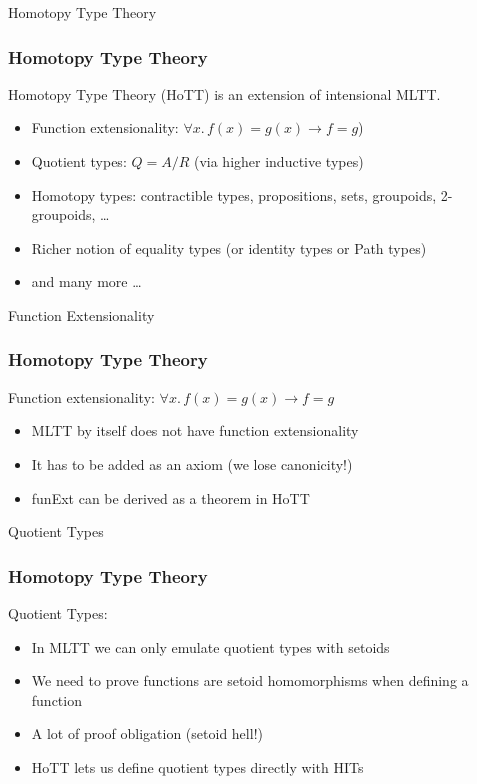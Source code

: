 \documentclass[9pt]{beamer}
\begin{document}
\begin{frame}{Homotopy Type Theory}
\frametitle{Homotopy Type Theory}

Homotopy Type Theory (HoTT) is an extension of intensional MLTT.

\begin{itemize}

  \item Function extensionality: $\forall x. \, f(x) = g(x) \rightarrow f = g$)

  \item Quotient types: $Q = A / R$ (via higher inductive types)

  \item Homotopy types: contractible types, propositions, sets, groupoids, 2-groupoids, \ldots

  \item Richer notion of equality types (or identity types or Path types)

  \item and many more \ldots

\end{itemize}

\end{frame}

\begin{frame}{Function Extensionality}
\frametitle{Homotopy Type Theory}

Function extensionality: $\forall x. \, f(x) = g(x) \rightarrow f = g$

\begin{itemize}

  \item MLTT by itself does not have function extensionality

  \item It has to be added as an axiom (we lose \alert{canonicity}!)

  \item<2-> funExt can be derived as a theorem in HoTT

\end{itemize}

\end{frame}

\begin{frame}{Quotient Types}
\frametitle{Homotopy Type Theory}

Quotient Types:

\begin{itemize}

  \item In MLTT we can only emulate quotient types with setoids
  \item We need to prove functions are setoid homomorphisms when defining a function
  \item A lot of proof obligation (\alert{setoid hell}!)
  \item<2-> HoTT lets us define quotient types directly with HITs

\end{itemize}

\end{frame}
\end{document}
